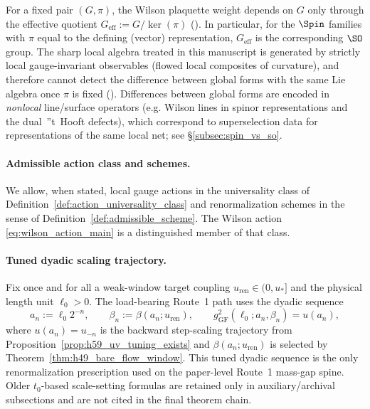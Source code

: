 \begin{remark}
For a fixed pair $(G,\pi)$, the Wilson plaquette weight depends on $G$ only through the effective quotient
$G_{\mathrm{eff}}:=G/\ker(\pi)$ ().
In particular, for the $\Spin$ families with $\pi$ equal to the defining (vector) representation, $G_{\mathrm{eff}}$ is the corresponding $\SO$ group.
The sharp local algebra treated in this manuscript is generated by strictly local gauge-invariant observables (flowed local composites of curvature),
and therefore cannot detect the difference between global forms with the same Lie algebra once $\pi$ is fixed ().
Differences between global forms are encoded in \emph{nonlocal} line/surface operators (e.g. Wilson lines in spinor representations and the dual \,''t~Hooft defects),
which correspond to superselection data for representations of the same local net; see \S\ref{subsec:spin_vs_so}.
\end{remark}

\paragraph{Admissible action class and schemes.}
We allow, when stated, local gauge actions in the universality class of Definition~\ref{def:action_universality_class} and renormalization schemes in the sense of Definition~\ref{def:admissible_scheme}.
The Wilson action \eqref{eq:wilson_action_main} is a distinguished member of that class.

\paragraph{Tuned dyadic scaling trajectory.}
Fix once and for all a weak-window target coupling $u_{\mathrm{ren}}\in(0,u_\ast]$ and the physical length unit $\ell_0>0$.
The load-bearing Route~1 path uses the dyadic sequence
\begin{equation}
 a_n:=\ell_0 2^{-n},
 \qquad
 \beta_n:=\beta(a_n;u_{\mathrm{ren}}),
 \qquad
 g_{\mathrm{GF}}^2(\ell_0;a_n,\beta_n)=u(a_n),
 \label{eq:a_beta_main}
\end{equation}
where $u(a_n)=u_{-n}$ is the backward step-scaling trajectory from Proposition~\ref{prop:h59_uv_tuning_exists} and
$\beta(a_n;u_{\mathrm{ren}})$ is selected by Theorem~\ref{thm:h49_bare_flow_window}.
This tuned dyadic sequence is the only renormalization prescription used on the paper-level Route~1 mass-gap spine.
Older $t_0$-based scale-setting formulas are retained only in auxiliary/archival subsections and are not cited in the final theorem chain.

